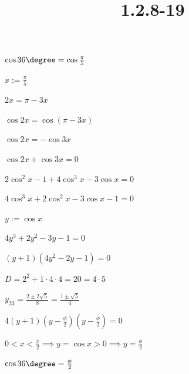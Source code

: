\documentclass{article}
\title{1.2.8-19}
\begin{document}
\maketitle

$\cos 36\degree = \cos\frac{\pi}{5}$

$x := \frac{\pi}{5}$

$2x = \pi - 3x$

$\cos{2x} = \cos(\pi - 3x)$

$\cos{2x} = -\cos{3x}$

$\cos{2x} + \cos{3x} = 0$

$2\cos^2x - 1 + 4\cos^3x-3\cos x = 0$

$4\cos^3x+2\cos^2x-3\cos x-1=0$

$y := \cos x$

$4y^3+2y^2-3y-1=0$

$(y+1)(4y^2-2y-1)=0$

$D = 2^2+1\cdot4\cdot 4=20=4\cdot5$

$y_{23}=\frac{2\pm 2\sqrt{5}}{8} = \frac{1\pm\sqrt{5}}{4}$

$4(y+1)(y-\frac{\phi}{2})(y-\frac{\hat\phi}{2}) = 0$

$0 < x < \frac{\pi}{2} \implies y = \cos x > 0 \implies y = \frac{\phi}{2}$

$\cos 36\degree = \frac{\phi}{2}$
\end{document}
